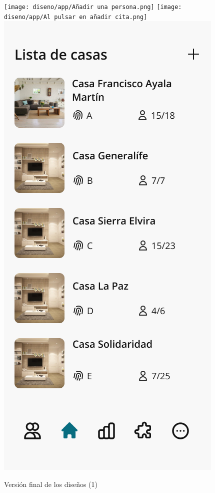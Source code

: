\begin{figure}[hp!]
    \texttt{[image: diseno/app/Añadir una persona.png]}
    \hspace{0.03\linewidth}
    \texttt{[image: diseno/app/Al pulsar en añadir cita.png]}
    \hspace{0.03\linewidth}
    \includegraphics[width=0.30\linewidth]{diseno/app/Principal casas.png}

    \caption{Versión final de los diseños (1)}
    \label{fig:dis-fin1}

\end{figure}

